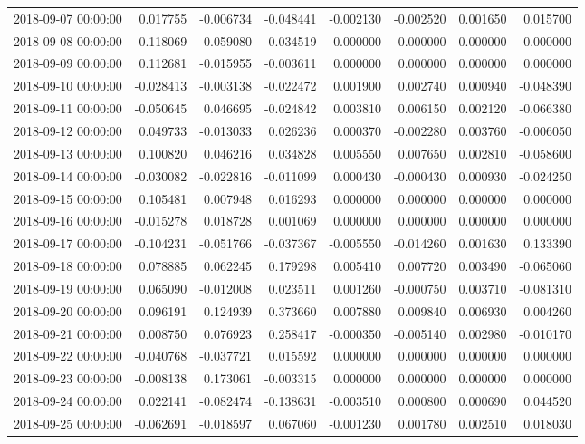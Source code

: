 \begin{tabular}{lrrrrrrr}
2018-09-07 00:00:00 & 0.017755 & -0.006734 & -0.048441 & -0.002130 & -0.002520 & 0.001650 & 0.015700 \\
2018-09-08 00:00:00 & -0.118069 & -0.059080 & -0.034519 & 0.000000 & 0.000000 & 0.000000 & 0.000000 \\
2018-09-09 00:00:00 & 0.112681 & -0.015955 & -0.003611 & 0.000000 & 0.000000 & 0.000000 & 0.000000 \\
2018-09-10 00:00:00 & -0.028413 & -0.003138 & -0.022472 & 0.001900 & 0.002740 & 0.000940 & -0.048390 \\
2018-09-11 00:00:00 & -0.050645 & 0.046695 & -0.024842 & 0.003810 & 0.006150 & 0.002120 & -0.066380 \\
2018-09-12 00:00:00 & 0.049733 & -0.013033 & 0.026236 & 0.000370 & -0.002280 & 0.003760 & -0.006050 \\
2018-09-13 00:00:00 & 0.100820 & 0.046216 & 0.034828 & 0.005550 & 0.007650 & 0.002810 & -0.058600 \\
2018-09-14 00:00:00 & -0.030082 & -0.022816 & -0.011099 & 0.000430 & -0.000430 & 0.000930 & -0.024250 \\
2018-09-15 00:00:00 & 0.105481 & 0.007948 & 0.016293 & 0.000000 & 0.000000 & 0.000000 & 0.000000 \\
2018-09-16 00:00:00 & -0.015278 & 0.018728 & 0.001069 & 0.000000 & 0.000000 & 0.000000 & 0.000000 \\
2018-09-17 00:00:00 & -0.104231 & -0.051766 & -0.037367 & -0.005550 & -0.014260 & 0.001630 & 0.133390 \\
2018-09-18 00:00:00 & 0.078885 & 0.062245 & 0.179298 & 0.005410 & 0.007720 & 0.003490 & -0.065060 \\
2018-09-19 00:00:00 & 0.065090 & -0.012008 & 0.023511 & 0.001260 & -0.000750 & 0.003710 & -0.081310 \\
2018-09-20 00:00:00 & 0.096191 & 0.124939 & 0.373660 & 0.007880 & 0.009840 & 0.006930 & 0.004260 \\
2018-09-21 00:00:00 & 0.008750 & 0.076923 & 0.258417 & -0.000350 & -0.005140 & 0.002980 & -0.010170 \\
2018-09-22 00:00:00 & -0.040768 & -0.037721 & 0.015592 & 0.000000 & 0.000000 & 0.000000 & 0.000000 \\
2018-09-23 00:00:00 & -0.008138 & 0.173061 & -0.003315 & 0.000000 & 0.000000 & 0.000000 & 0.000000 \\
2018-09-24 00:00:00 & 0.022141 & -0.082474 & -0.138631 & -0.003510 & 0.000800 & 0.000690 & 0.044520 \\
2018-09-25 00:00:00 & -0.062691 & -0.018597 & 0.067060 & -0.001230 & 0.001780 & 0.002510 & 0.018030 \\

\end{tabular}
